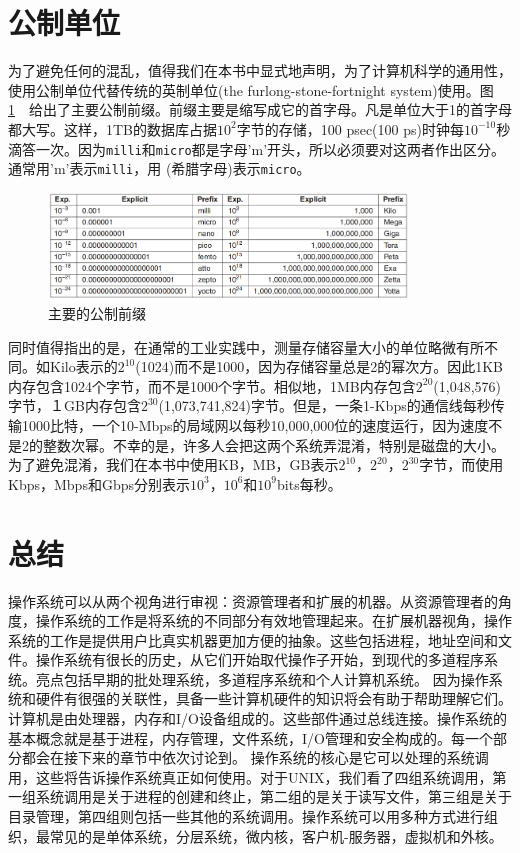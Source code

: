 	\section{公制单位}
	
	为了避免任何的混乱，值得我们在本书中显式地声明，为了计算机科学的通用性，使用公制单位代替传统的英制单位(the furlong-stone-fortnight system)使用。图　\ref{fig:metric-prefixes}　给出了主要公制前缀。前缀主要是缩写成它的首字母。凡是单位大于1的首字母都大写。这样，1TB的数据库占据$10^{2}$字节的存储，100 psec(100 ps)时钟每$10^{-10}$秒滴答一次。因为\texttt{milli}和\texttt{micro}都是字母'm'开头，所以必须要对这两者作出区分。通常用'm'表示\texttt{milli}，用 \textmu(希腊字母)表示\texttt{micro}。
		
	\begin{figure}[ht]\small
		\centering
		\includegraphics[width=0.85\textwidth]{FIG/1-31.png}
		\caption{主要的公制前缀}\label{fig:metric-prefixes}
	\end{figure}

	同时值得指出的是，在通常的工业实践中，测量存储容量大小的单位略微有所不同。如Kilo表示的$2^{10}$(1024)而不是1000，因为存储容量总是2的幂次方。因此1KB内存包含1024个字节，而不是1000个字节。相似地，1MB内存包含$2^{20}$(1,048,576)字节，１GB内存包含$2^{30}$(1,073,741,824)字节。但是，一条1-Kbps的通信线每秒传输1000比特，一个10-Mbps的局域网以每秒10,000,000位的速度运行，因为速度不是2的整数次幂。不幸的是，许多人会把这两个系统弄混淆，特别是磁盘的大小。为了避免混淆，我们在本书中使用KB，MB，GB表示$2^{10}$，$2^{20}$，$2^{30}$字节，而使用Kbps，Mbps和Gbps分别表示$10^{3}$，$10^{6}$和$10^{9}$bits每秒。
	
	\section{总结}
	
	操作系统可以从两个视角进行审视：资源管理者和扩展的机器。从资源管理者的角度，操作系统的工作是将系统的不同部分有效地管理起来。在扩展机器视角，操作系统的工作是提供用户比真实机器更加方便的抽象。这些包括进程，地址空间和文件。操作系统有很长的历史，从它们开始取代操作子开始，到现代的多道程序系统。亮点包括早期的批处理系统，多道程序系统和个人计算机系统。
	因为操作系统和硬件有很强的关联性，具备一些计算机硬件的知识将会有助于帮助理解它们。计算机是由处理器，内存和I/O设备组成的。这些部件通过总线连接。操作系统的基本概念就是基于进程，内存管理，文件系统，I/O管理和安全构成的。每一个部分都会在接下来的章节中依次讨论到。
	操作系统的核心是它可以处理的系统调用，这些将告诉操作系统真正如何使用。对于UNIX，我们看了四组系统调用，第一组系统调用是关于进程的创建和终止，第二组的是关于读写文件，第三组是关于目录管理，第四组则包括一些其他的系统调用。操作系统可以用多种方式进行组织，最常见的是单体系统，分层系统，微内核，客户机-服务器，虚拟机和外核。
	
